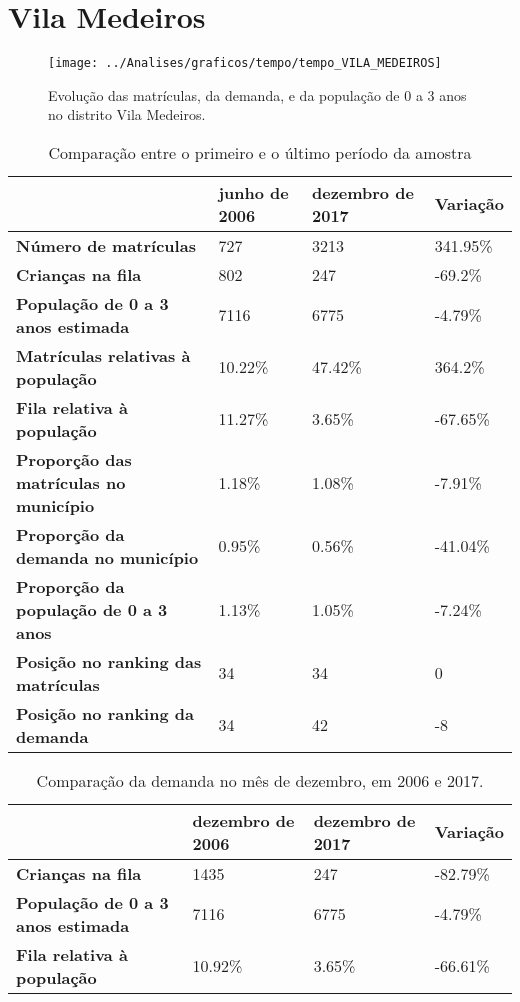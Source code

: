 \section{Vila Medeiros}
\begin{figure}[H]
\centering
\texttt{[image: ../Analises/graficos/tempo/tempo\_VILA\_MEDEIROS]}
\caption{Evolução das matrículas, da demanda, e da população de 0 a 3 anos no distrito Vila Medeiros.}
\end{figure}
\begin{table}[H]
\begin{tabular}{|l|l|l|l|}
\hline
\textbf{}                                      & \textbf{junho de 2006}       & \textbf{dezembro de 2017}    & \textbf{Variação} \\ \hline
\textbf{Número de matrículas}                  & 727 & 3213 & 341.95\% \\ \hline
\textbf{Crianças na fila}                      & 802 & 247 & -69.2\% \\ \hline
\textbf{População de 0 a 3 anos estimada}      & 7116 & 6775 & -4.79\% \\ \hline
\textbf{Matrículas relativas à população}      & 10.22\% & 47.42\% & 364.2\% \\ \hline
\textbf{Fila relativa à população}             & 11.27\% & 3.65\% & -67.65\% \\ \hline
\textbf{Proporção das matrículas no município} & 1.18\% & 1.08\% & -7.91\% \\ \hline
\textbf{Proporção da demanda no município}     & 0.95\% & 0.56\% & -41.04\% \\ \hline
\textbf{Proporção da população de 0 a 3 anos}  & 1.13\% & 1.05\% & -7.24\% \\ \hline
\textbf{Posição no ranking das matrículas}     & 34 & 34 & 0 \\ \hline
\textbf{Posição no ranking da demanda}         & 34 & 42 & -8 \\ \hline
\end{tabular}
\caption{Comparação entre o primeiro e o último período da amostra}
\end{table}
\begin{table}[H]
\begin{tabular}{|l|l|l|l|}
\hline
\textbf{}                                 & \textbf{dezembro de 2006} & \textbf{dezembro de 2017} & \textbf{Variação} \\ \hline
\textbf{Crianças na fila}                      & 1435 & 247 & -82.79\% \\ \hline
\textbf{População de 0 a 3 anos estimada}      & 7116 & 6775 & -4.79\% \\ \hline
\textbf{Fila relativa à população}             & 10.92\% & 3.65\% & -66.61\% \\ \hline
\end{tabular}
\caption{Comparação da demanda no mês de dezembro, em 2006 e 2017.}
\end{table}

